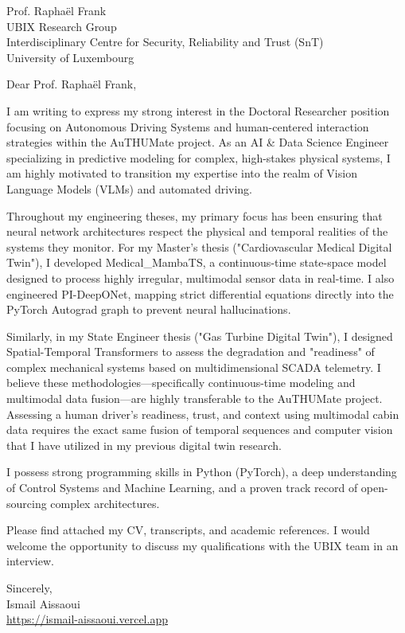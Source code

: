 \documentclass[11pt, a4paper]{letter}
\begin{document}
\begin{letter}{Prof. Raphaël Frank \\ UBIX Research Group \\ Interdisciplinary Centre for Security, Reliability and Trust (SnT) \\ University of Luxembourg}
\opening{Dear Prof. Raphaël Frank,}

I am writing to express my strong interest in the Doctoral Researcher position focusing on Autonomous Driving Systems and human-centered interaction strategies within the AuTHUMate project. As an AI \& Data Science Engineer specializing in predictive modeling for complex, high-stakes physical systems, I am highly motivated to transition my expertise into the realm of Vision Language Models (VLMs) and automated driving.

Throughout my engineering theses, my primary focus has been ensuring that neural network architectures respect the physical and temporal realities of the systems they monitor. For my Master's thesis ("Cardiovascular Medical Digital Twin"), I developed Medical\_MambaTS, a continuous-time state-space model designed to process highly irregular, multimodal sensor data in real-time. I also engineered PI-DeepONet, mapping strict differential equations directly into the PyTorch Autograd graph to prevent neural hallucinations. 

Similarly, in my State Engineer thesis ("Gas Turbine Digital Twin"), I designed Spatial-Temporal Transformers to assess the degradation and "readiness" of complex mechanical systems based on multidimensional SCADA telemetry. I believe these methodologies—specifically continuous-time modeling and multimodal data fusion—are highly transferable to the AuTHUMate project. Assessing a human driver’s readiness, trust, and context using multimodal cabin data requires the exact same fusion of temporal sequences and computer vision that I have utilized in my previous digital twin research.

I possess strong programming skills in Python (PyTorch), a deep understanding of Control Systems and Machine Learning, and a proven track record of open-sourcing complex architectures. 

Please find attached my CV, transcripts, and academic references. I would welcome the opportunity to discuss my qualifications with the UBIX team in an interview.

\closing{Sincerely, \\ Ismail Aissaoui \\ \href{https://ismail-aissaoui.vercel.app}{https://ismail-aissaoui.vercel.app}}
\end{letter}
\end{document}

